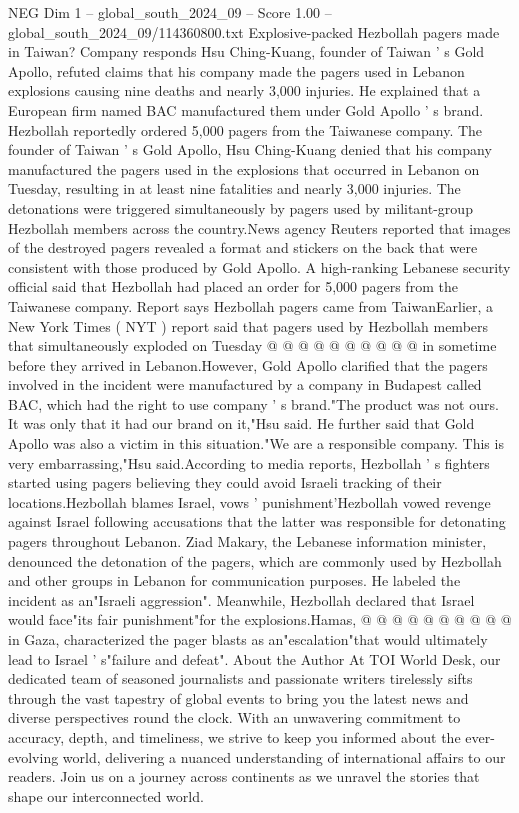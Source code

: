 \begin{textsample}{NEG Dim 1 – global\_south\_2024\_09 – Score 1.00 – global\_south\_2024\_09/114360800.txt}  \label{ex:f1_neg_244}
Explosive-packed Hezbollah pagers made in Taiwan?
Company responds Hsu Ching-Kuang, founder of Taiwan ' s Gold Apollo, refuted claims that his company made the pagers used in Lebanon explosions causing nine deaths and nearly 3,000 injuries.
He explained that a European firm named BAC manufactured them under Gold Apollo ' s brand.
Hezbollah reportedly ordered 5,000 pagers from the Taiwanese company.
The founder of Taiwan ' s Gold Apollo, Hsu Ching-Kuang denied that his company manufactured the pagers used in the explosions that occurred in Lebanon on Tuesday, resulting in at least nine fatalities and nearly 3,000 injuries.
The detonations were triggered simultaneously by pagers used by militant-group Hezbollah members across the country.News agency Reuters reported that images of the destroyed pagers revealed a format and stickers on the back that were consistent with those produced by Gold Apollo.
A high-ranking Lebanese security official said that Hezbollah had placed an order for 5,000 pagers from the Taiwanese company.
Report says Hezbollah pagers came from TaiwanEarlier, a New York Times ( NYT ) report said that pagers used by Hezbollah members that simultaneously exploded on Tuesday @ @ @ @ @ @ @ @ @ @ in sometime before they arrived in Lebanon.However, Gold Apollo clarified that the pagers involved in the incident were manufactured by a company in Budapest called BAC, which had the right to use company ' s brand."The product was not ours.
It was only that it had our brand on it,"Hsu said.
He further said that Gold Apollo was also a victim in this situation."We are a responsible company.
This is very embarrassing,"Hsu said.According to media reports, Hezbollah ' s fighters started using pagers believing they could avoid Israeli tracking of their locations.Hezbollah blames Israel, vows ' punishment'Hezbollah vowed revenge against Israel following accusations that the latter was responsible for detonating pagers throughout Lebanon.
Ziad Makary, the Lebanese information minister, denounced the detonation of the pagers, which are commonly used by Hezbollah and other groups in Lebanon for communication purposes.
He labeled the incident as an"Israeli aggression".
Meanwhile, Hezbollah declared that Israel would face"its fair punishment"for the explosions.Hamas, @ @ @ @ @ @ @ @ @ @ in Gaza, characterized the pager blasts as an"escalation"that would ultimately lead to Israel ' s"failure and defeat".
About the Author At TOI World Desk, our dedicated team of seasoned journalists and passionate writers tirelessly sifts through the vast tapestry of global events to bring you the latest news and diverse perspectives round the clock.
With an unwavering commitment to accuracy, depth, and timeliness, we strive to keep you informed about the ever-evolving world, delivering a nuanced understanding of international affairs to our readers.
Join us on a journey across continents as we unravel the stories that shape our interconnected world.

\end{textsample}
